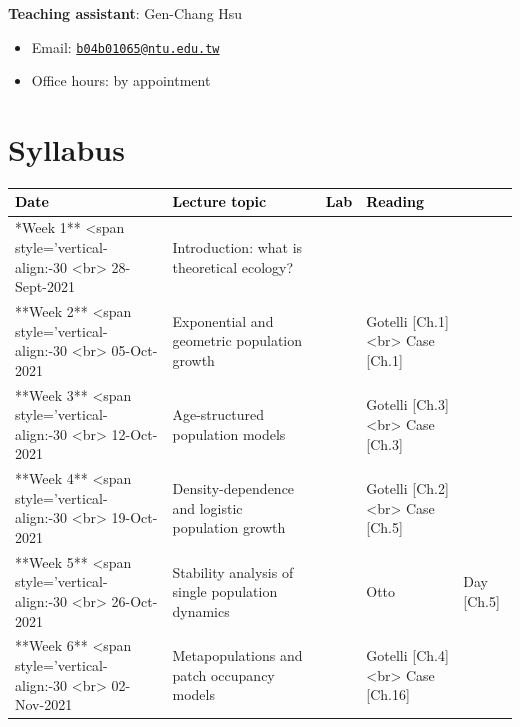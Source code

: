 \documentclass[
]{book}
\providecommand{\tightlist}{%
  \setlength{\itemsep}{0pt}\setlength{\parskip}{0pt}}
\begin{document}
\textbf{Teaching assistant}: Gen-Chang Hsu

\begin{itemize}
\tightlist
\item
  Email: \href{mailto:b04b01065@ntu.edu.tw}{\nolinkurl{b04b01065@ntu.edu.tw}}
\item
  Office hours: by appointment
\end{itemize}

\hypertarget{syllabus}{%
\chapter*{Syllabus}\label{syllabus}}

\begingroup\fontsize{17}{19}\selectfont

\begin{tabu} to 
\hline
\begingroup\fontsize{20}{22}\selectfont \textcolor{black}{\textbf{Date}}\endgroup & \begingroup\fontsize{20}{22}\selectfont \textcolor{black}{\textbf{Lecture topic}}\endgroup & \begingroup\fontsize{20}{22}\selectfont \textcolor{black}{\textbf{Lab}}\endgroup & \begingroup\fontsize{20}{22}\selectfont \textcolor{black}{\textbf{Reading}}\endgroup\\
\hline
**Week 1** <span style='vertical-align:-30%
           <br> 28-Sept-2021 & Introduction: what is theoretical ecology? &  & \\
\hline
**Week 2** <span style='vertical-align:-30%
           <br> 05-Oct-2021 & Exponential and geometric population growth &  & Gotelli [Ch.1] <br> Case [Ch.1]\\
\hline
**Week 3** <span style='vertical-align:-30%
           <br> 12-Oct-2021 & Age-structured population models &  & Gotelli [Ch.3] <br> Case [Ch.3]\\
\hline
**Week 4** <span style='vertical-align:-30%
           <br> 19-Oct-2021 & Density-dependence and logistic population growth &  & Gotelli [Ch.2] <br> Case [Ch.5]\\
\hline
**Week 5** <span style='vertical-align:-30%
           <br> 26-Oct-2021 & Stability analysis of single population dynamics &  & Otto & Day [Ch.5]\\
\hline
**Week 6** <span style='vertical-align:-30%
           <br> 02-Nov-2021 & Metapopulations and patch occupancy models &  & Gotelli [Ch.4] <br> Case [Ch.16]\\
\hline

\end{tabu}
\end{document}
